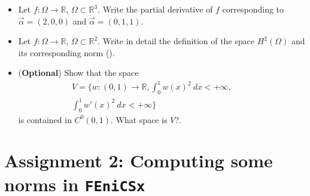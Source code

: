 \begin{kaobox}[frametitle=Solve the following exercices]
\begin{itemize}

\item Let $f: \Omega \rightarrow \mathbb{R}$, $\Omega \subset \mathbb{R}^3$. 
Write the partial derivative of $f$ corresponding to $\vec{\alpha} = (2,0,0)$
and $\vec{\alpha} = (0,1,1)$. \\

\item Let $f: \Omega \rightarrow \mathbb{R}$, $\Omega \subset \mathbb{R}^2$.
Write in detail the definition of the space $H^2(\Omega)$ and its corresponding
norm (). \\


\item (\textbf{Optional}) Show that the space 
\begin{eqnarray}
V = \{ w:(0,1)\to \mathbb{R}, \int_0^1 w(x)^2~dx <+\infty,~~~~~~~~~~~ \nonumber \\
\int_0^1 w'(x)^2~dx <+\infty\} \nonumber
\end{eqnarray}
is contained in $C^0(0,1)$. What space is $V$?.


\end{itemize}
\end{kaobox}


\section{{\color{gray!50!cyan} Assignment 2: Computing some norms in \texttt{FEniCSx}}}


